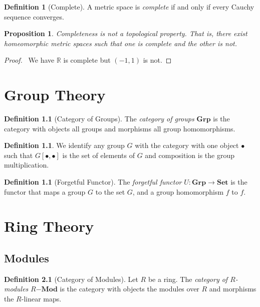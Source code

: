 \documentclass{book}
\let\qed\relax
\newtheorem{proposition}[lemma]{Proposition}
\theoremstyle{definition}
\newtheorem{definition}[lemma]{Definition}
\newcommand{\Real}{\ensuremath{\mathbb{R}}}
\newcommand{\Set}{\ensuremath{\mathbf{Set}}}
\begin{document}
\begin{definition}[Complete]
    A metric space is \emph{complete} if and only if every Cauchy sequence converges.
\end{definition}

\begin{proposition}
    Completeness is not a topological property. That is, there exist homeomorphic metric spaces such that one is complete and the other is
    not.
\end{proposition}

\begin{proof}
    \pf\ We have $\Real$ is complete but $(-1,1)$ is not. \qed
\end{proof}

\chapter{Group Theory}

\begin{definition}[Category of Groups]
    The \emph{category of groups} $\mathbf{Grp}$ is the category with objects all groups and morphisms all group homomorphisms.
\end{definition}

\begin{definition}
    We identify any group $G$ with the category with one object $\bullet$ such that $G[\bullet,\bullet]$ is the set of elements
    of $G$ and composition is the group multiplication.
\end{definition}

\begin{definition}[Forgetful Functor]
    The \emph{forgetful functor} $U : \mathbf{Grp} \rightarrow \Set$ is the functor that maps a group $G$ to the set $G$, and a group
    homomorphism $f$ to $f$.
\end{definition}

\chapter{Ring Theory}

\section{Modules}

\begin{definition}[Category of Modules]
    Let $R$ be a ring. The \emph{category of $R$-modules} $R\mathbf{-Mod}$ is the category with objects the modules over $R$
    and morphisms the $R$-linear maps.
\end{definition}
\end{document}
